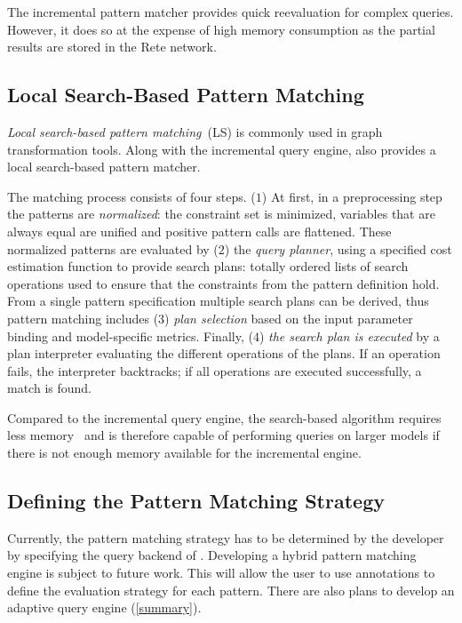 \documentclass[submission,copyright,creativecommons]{eptcs}
\begin{document}
The incremental pattern matcher provides quick reevaluation for complex queries. However, it does so at the expense of high memory consumption as the partial results are stored in the Rete network.

\subsection{Local Search-Based Pattern Matching}

\emph{Local search-based pattern matching}~(LS) is commonly used in graph transformation tools. Along with the incremental query engine, \eiq also provides a local search-based pattern matcher. 

The matching process consists of four steps. ($1$) At first, in a preprocessing step the patterns are \emph{normalized}: the constraint set is minimized, variables that are always equal are unified and positive pattern calls are flattened. These normalized patterns are evaluated by ($2$) the \emph{query planner}, using a specified cost estimation function to provide search plans: %
totally ordered lists of search operations used to ensure that the constraints from the pattern definition hold. From a single pattern specification multiple search plans can be derived, thus pattern matching includes ($3$) \emph{plan selection} based on the input parameter binding and model-specific metrics. Finally, ($4$) \emph{the search plan is executed} by a plan interpreter evaluating the different operations of the plans. If an operation fails, the interpreter backtracks; if all operations are executed successfully, a match is found.

Compared to the incremental query engine, the search-based algorithm requires less memory~\cite{IST15} and is therefore capable of performing queries on larger models if there is not enough memory available for the incremental engine.

\subsection{Defining the Pattern Matching Strategy}

Currently, the pattern matching strategy has to be determined by the developer by specifying the query backend of \eiq. Developing a hybrid pattern matching engine is subject to future work. This will allow the user to use annotations to define the evaluation strategy for each pattern. There are also plans to develop an adaptive query engine (\autoref{summary}).
\end{document}
